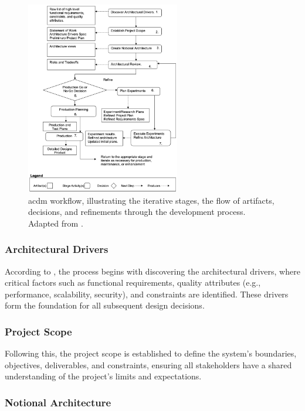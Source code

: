 \begin{figure}[!htb]
    \includegraphics[width=0.6\textwidth]{figs/chapter3/acdm_workflow.png}
    \centering
    \caption[\acl{acdm} Workflow]{\ac{acdm} workflow, illustrating the iterative stages, the flow of artifacts, decisions, and refinements through the development process. Adapted from .}
    \label{fig:acdm_workflow}
\end{figure}

\subsubsection{Architectural Drivers}

According to , the process begins with discovering the architectural drivers, where critical factors such as functional requirements, quality attributes (e.g., performance, scalability, security), and constraints are identified. These drivers form the foundation for all subsequent design decisions. 

\subsubsection{Project Scope}

Following this, the project scope is established to define the system's boundaries, objectives, deliverables, and constraints, ensuring all stakeholders have a shared understanding of the project's limits and expectations.

\subsubsection{Notional Architecture}


